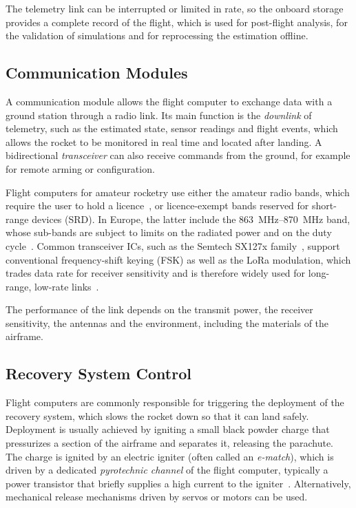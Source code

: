 The telemetry link can be interrupted or limited in rate, so the onboard storage provides a complete record of the flight, which is used for post-flight analysis, for the validation of simulations and for reprocessing the estimation offline.

\subsection{Communication Modules}

A communication module allows the flight computer to exchange data with a ground station through a radio link. Its main function is the \emph{downlink} of telemetry, such as the estimated state, sensor readings and flight events, which allows the rocket to be monitored in real time and located after landing. A bidirectional \emph{transceiver} can also receive commands from the ground, for example for remote arming or configuration.

Flight computers for amateur rocketry use either the amateur radio bands, which require the user to hold a licence~\cite{altus:telemetrum}, or licence-exempt bands reserved for short-range devices (SRD). In Europe, the latter include the \SIrange{863}{870}{MHz} band, whose sub-bands are subject to limits on the radiated power and on the duty cycle~\cite{erc7003,etsi300220}. Common transceiver ICs, such as the Semtech SX127x family~\cite{sx1276}, support conventional frequency-shift keying (FSK) as well as the LoRa modulation, which trades data rate for receiver sensitivity and is therefore widely used for long-range, low-rate links~\cite{augustin2016lora}.

The performance of the link depends on the transmit power, the receiver sensitivity, the antennas and the environment, including the materials of the airframe.
    
\subsection{Recovery System Control}

Flight computers are commonly responsible for triggering the deployment of the recovery system, which slows the rocket down so that it can land safely. Deployment is usually achieved by igniting a small black powder charge that pressurizes a section of the airframe and separates it, releasing the parachute. The charge is ignited by an electric igniter (often called an \emph{e-match}), which is driven by a dedicated \emph{pyrotechnic channel} of the flight computer, typically a power transistor that briefly supplies a high current to the igniter~\cite{altus:telemetrum,featherweight:blueraven}. Alternatively, mechanical release mechanisms driven by servos or motors can be used.

